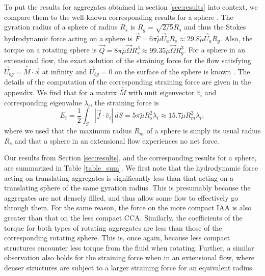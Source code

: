 To put the results for aggregates obtained in section \ref{sec:results} into context, we compare them to the well-known corresponding results for a sphere \cite{guazzelli_physical_2011}. 
The gyration radius of a sphere of radius $R_s$ is $R_g = \sqrt{2/5} R_s$ and thus the Stokes hydrodynamic force acting on a sphere is $\vec{F} = 6 \pi \tilde{\mu} \vec{U}_a R_s \approx 29.8 \tilde{\mu} \vec{U}_a  R_g$.  Also, the torque on a rotating sphere is $\vec{Q} = 8 \pi \tilde{\mu} \vec{\Omega} R_s^3 \approx 99.35 \tilde{\mu} \vec{\Omega} R_g^3$. For a sphere in an extensional flow, the exact solution of the straining force for the flow satisfying $\vec{U}_{bg} = \bar{\bar{M}}\cdot \vec{x}$ at infinity and $\vec{U}_{bg} = 0$ on the surface of the sphere is known \cite{guazzelli_physical_2011}. The details of the computation of the corresponding straining force are given in the appendix. We find that for a matrix $\bar{\bar{M}}$ with unit eigenvector $\hat{v}_i$ and corresponding eigenvalue $\lambda_i$, the straining force is
\[
E_{i}  = \frac{1}{2} \int_S | \vec{f} \cdot \hat{v}_i | \ dS = 5  \pi \tilde{\mu} R_s^2 \lambda_i \approx 15.7  \tilde{\mu} R_m^2  \lambda_i,
\] 
where we used that the maximum radius $R_m$ of a sphere is simply its usual radius $R_s$ and that a sphere in an extensional flow experiences no net force. 


Our results from Section \ref{sec:results}, and the corresponding results for a sphere, are summarized in Table  \ref{table_sum}. We first note that the hydrodynamic force acting on translating aggregates is significantly less than that acting on a translating sphere of the same gyration radius. This is presumably because the aggregates are not densely filled, and thus allow some flow to effectively go through them. For the same reason, the force on the more compact IAA is also greater than that on the less compact CCA.
Similarly, the coefficients of the torque for both types of rotating aggregates are less than those of the corresponding rotating sphere. This is, once again, because less compact structures encounter less torque from the fluid when rotating. Further, a similar observation also holds for the straining force when in an extensional flow, where denser structures are subject to a larger straining force for an equivalent radius. 

